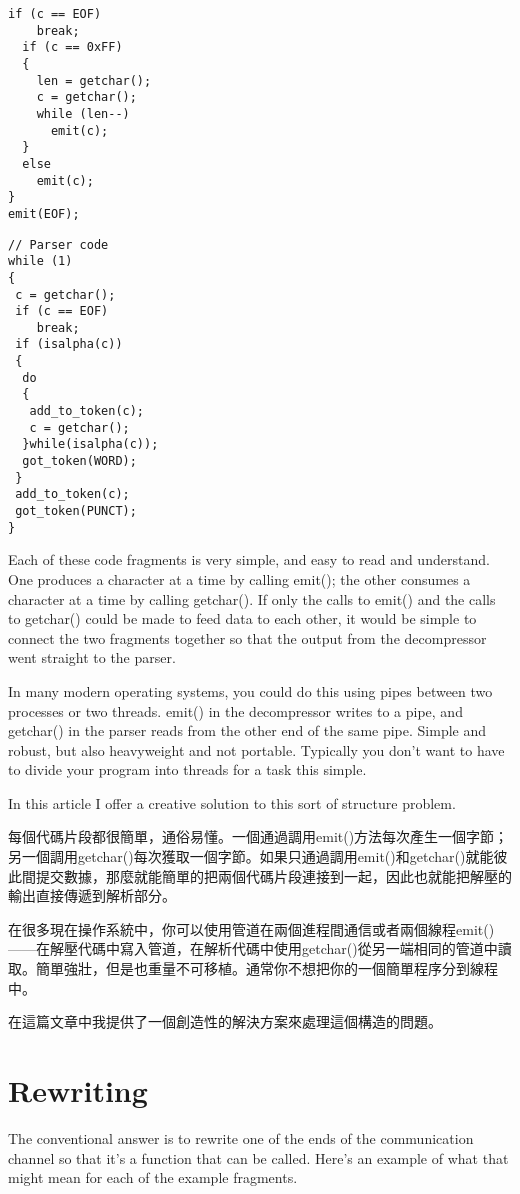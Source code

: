 \documentclass[12pt]{article}
\begin{document}
\begin{CJK}{UTF8}{bsmi}
\begin{multicols}{2}
\begin{lstlisting}[caption=decompression, basicstyle=\footnotesize, breaklines=true, frame=single,frameround=tttt]
  if (c == EOF)
    break;
  if (c == 0xFF) 
  {
    len = getchar();
    c = getchar();
    while (len--)
      emit(c);
  } 
  else
    emit(c);
}
emit(EOF);
\end{lstlisting}

\begin{lstlisting}[caption=parser, basicstyle=\footnotesize, breaklines=true, frame=single,frameround=tttt]
// Parser code 
while (1) 
{
 c = getchar();
 if (c == EOF)
    break;
 if (isalpha(c)) 
 {
  do 
  {
   add_to_token(c);
   c = getchar();
  }while(isalpha(c));
  got_token(WORD);
 }
 add_to_token(c);
 got_token(PUNCT);
}

\end{lstlisting}
\end{multicols}

 Each of these code fragments is very simple, and easy to read and understand. One produces a character at a time by calling emit(); the other consumes a character at a time by calling getchar(). If only the calls to emit() and the calls to getchar() could be made to feed data to each other, it would be simple to connect the two fragments together so that the output from the decompressor went straight to the parser.

 In many modern operating systems, you could do this using pipes between two processes or two threads. emit() in the decompressor writes to a pipe, and getchar() in the parser reads from the other end of the same pipe. Simple and robust, but also heavyweight and not portable. Typically you don't want to have to divide your program into threads for a task this simple.

 In this article I offer a creative solution to this sort of structure problem. 

每個代碼片段都很簡單，通俗易懂。一個通過調用emit()方法每次產生一個字節；另一個調用getchar()每次獲取一個字節。如果只通過調用emit()和getchar()就能彼此間提交數據，那麼就能簡單的把兩個代碼片段連接到一起，因此也就能把解壓的輸出直接傳遞到解析部分。

在很多現在操作系統中，你可以使用管道在兩個進程間通信或者兩個線程emit()——在解壓代碼中寫入管道，在解析代碼中使用getchar()從另一端相同的管道中讀取。簡單強壯，但是也重量不可移植。通常你不想把你的一個簡單程序分到線程中。

在這篇文章中我提供了一個創造性的解決方案來處理這個構造的問題。 

\section{Rewriting}
 The conventional answer is to rewrite one of the ends of the communication channel so that it's a function that can be called. Here's an example of what that might mean for each of the example fragments.


\end{CJK}
\end{document}
